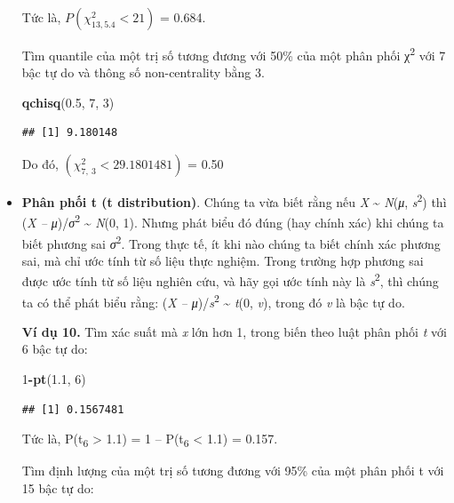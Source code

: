 \documentclass[
]{book}
\newenvironment{Shaded}{\begin{snugshade}}{\end{snugshade}}
\newcommand{\DecValTok}[1]{\textcolor[rgb]{0.00,0.00,0.81}{#1}}
\newcommand{\FloatTok}[1]{\textcolor[rgb]{0.00,0.00,0.81}{#1}}
\newcommand{\KeywordTok}[1]{\textcolor[rgb]{0.13,0.29,0.53}{\textbf{#1}}}
\newcommand{\NormalTok}[1]{#1}
\newcommand{\OperatorTok}[1]{\textcolor[rgb]{0.81,0.36,0.00}{\textbf{#1}}}
\begin{document}
\begin{itemize}
  Tức là, \(P\left( \chi_{13,5.4}^{2} < 21 \right)\) = 0.684.

  Tìm quantile của một trị số tương đương với 50\% của một phân phối χ\textsuperscript{2} với 7 bậc tự do và thông số non-centrality bằng 3.

\begin{Shaded}
\begin{Highlighting}[]
\KeywordTok{qchisq}\NormalTok{(}\FloatTok{0.5}\NormalTok{, }\DecValTok{7}\NormalTok{, }\DecValTok{3}\NormalTok{)}
\end{Highlighting}
\end{Shaded}

\begin{verbatim}
## [1] 9.180148
\end{verbatim}

  Do đó, \(\left( \chi_{7,\ 3}^{2} < 29.1801481 \right)\) = 0.50
\item
  \textbf{Phân phối t (t distribution)}. Chúng ta vừa biết rằng nếu \emph{X} \textasciitilde{} \emph{N}(\emph{μ}, \emph{s}\textsuperscript{2}) thì (\emph{X -- μ})/\emph{σ}\textsuperscript{2} \textasciitilde{} \emph{N}(0, 1). Nhưng phát biểu đó đúng (hay chính xác) khi chúng ta biết phương sai \emph{σ}\textsuperscript{2}. Trong thực tế, ít khi nào chúng ta biết chính xác phương sai, mà chỉ ước tính từ số liệu thực nghiệm. Trong trường hợp phương sai được ước tính từ số liệu nghiên cứu, và hãy gọi ước tính này là \emph{s}\textsuperscript{2}, thì chúng ta có thể phát biểu rằng: (\emph{X -- μ})/\emph{s}\textsuperscript{2} \textasciitilde{} \emph{t}(0, \emph{v}), trong đó \emph{v} là bậc tự do.

  \textbf{Ví dụ 10.} Tìm xác suất mà \emph{x} lớn hơn 1, trong biến theo luật phân phối \emph{t} với 6 bậc tự do:

\begin{Shaded}
\begin{Highlighting}[]
\DecValTok{1}\OperatorTok{{-}}\KeywordTok{pt}\NormalTok{(}\FloatTok{1.1}\NormalTok{, }\DecValTok{6}\NormalTok{)}
\end{Highlighting}
\end{Shaded}

\begin{verbatim}
## [1] 0.1567481
\end{verbatim}

  Tức là, P(t\textsubscript{6} \textgreater{} 1.1) = 1 -- P(t\textsubscript{6} \textless{} 1.1) = 0.157.

  Tìm định lượng của một trị số tương đương với 95\% của một phân phối t với 15 bậc tự do:


\end{itemize}
\end{document}
